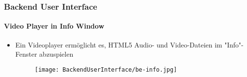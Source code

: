 
\begin{frame}[fragile]
	\frametitle{Backend User Interface}
	\framesubtitle{Video Player in Info Window}

	\begin{itemize}
		\item Ein Videoplayer ermöglicht es, HTML5 Audio- und Video-Dateien im "Info"-Fenster abzuspielen

		\begin{figure}
			\texttt{[image: BackendUserInterface/be-info.jpg]}
		\end{figure}

	\end{itemize}

\end{frame}

